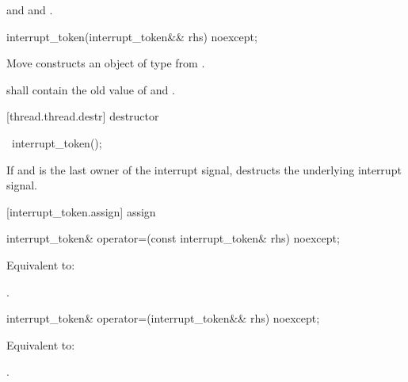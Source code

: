 {\begin{itemdescr}
  \pnum\postconditions {}
                and 
                and .
\end{itemdescr}

%
\begin{itemdecl}
interrupt_token(interrupt_token&& rhs) noexcept;
\end{itemdecl}
\begin{itemdescr}
  \pnum\effects Move constructs an object of type  from .

  \pnum\postconditions {} shall contain the old value of  and
                        .
\end{itemdescr}

[thread.thread.destr]{ destructor}

%
\begin{itemdecl}
~interrupt_token();
\end{itemdecl}

\begin{itemdescr}
 \pnum\effects If  and  is the last owner of the interrupt signal,
                destructs the underlying interrupt signal.
\end{itemdescr}

[interrupt_token.assign]{ assign}

%
\begin{itemdecl}
interrupt_token& operator=(const interrupt_token& rhs) noexcept;
\end{itemdecl}
\begin{itemdescr}
  \pnum\effects Equivalent to: 

  \pnum\returns {}.
\end{itemdescr}

%
\begin{itemdecl}
interrupt_token& operator=(interrupt_token&& rhs) noexcept;
\end{itemdecl}
\begin{itemdescr}
  \pnum\effects Equivalent to: 

  \pnum\returns {}.
\end{itemdescr}

}
